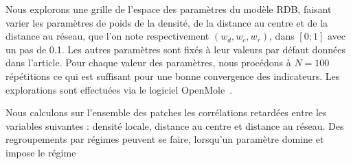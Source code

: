 \documentclass[french]{./sageo}
\begin{document}
Nous explorons une grille de l'espace des paramètres du modèle RDB, faisant varier les paramètres de poids de la densité, de la distance au centre et de la distance au réseau, que l'on note respectivement $(w_{d},w_{c},w_{r})$, dans $\left[0;1\right]$ avec un pas de 0.1. Les autres paramètres sont fixés à leur valeurs par défaut données dans l'article. Pour chaque valeur des paramètres, nous procédons à $N=100$ répétitions ce qui est suffisant pour une bonne convergence des indicateurs. Les explorations sont effectuées via le logiciel OpenMole~\cite{reuillon2013openmole}.

Nous calculons sur l'ensemble des patches les corrélations retardées entre les variables suivantes : densité locale, distance au centre et distance au réseau. Des regroupements par régimes peuvent se faire, lorsqu'un paramètre domine et impose le régime
\end{document}
